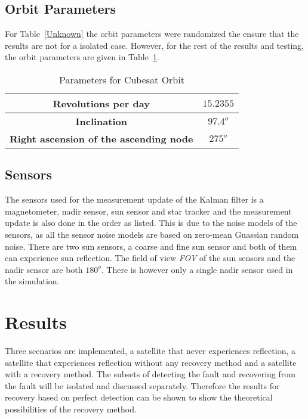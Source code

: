\documentclass[letterpaper, 10 pt, conference]{ieeeconf}  %
\begin{document}

\subsection{Orbit Parameters}
For Table~\ref{Unknown} the orbit parameters were randomized the ensure that the results are not for a isolated case. However, for the rest of the results and testing, the orbit parameters are given in Table~\ref{Table:OrbitParameters}. 
	
\begin{table}[!htb]
	\caption{\label{Table:OrbitParameters}Parameters for Cubesat Orbit}
	\begin{tabular}{|c|c|}
		\hline
		\textbf{Revolutions per day}          & $15.2355$                    \\ \hline
		\textbf{Inclination}          & $97.4^o$                    \\ \hline
		\textbf{Right ascension of the ascending node} & $275^o$ \\ \hline
	\end{tabular}
\end{table}

\subsection{Sensors}
The sensors used for the measurement update of the Kalman filter is a magnetometer, nadir sensor, sun sensor and star tracker and the measurement update is also done in the order as listed. This is due to the noise models of the sensors, as all the sensor noise models are based on zero-mean Guassian random noise. There are two sun sensors, a coarse and fine sun sensor and both of them can experience sun reflection. The field of view \emph{FOV} of the sun sensors and the nadir sensor are both $180^o$. There is however only a single nadir sensor used in the simulation.

\section{Results}
\label{section:Results}
Three scenarios are implemented, a satellite that never experiences reflection, a satellite that experiences reflection without any recovery method and a satellite with a recovery method. The subsets of detecting the fault and recovering from the fault will be isolated and discussed separately. Therefore the results for recovery based on perfect detection can be shown to show the theoretical possibilities of the recovery method.
\end{document}
